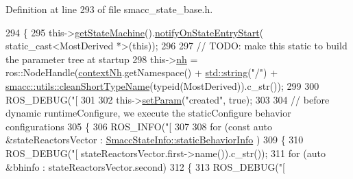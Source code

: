 Definition at line 293 of file smacc\+\_\+state\+\_\+base.\+h.


\begin{DoxyCode}
294   \{
295     this->\hyperlink{classsmacc_1_1SmaccState_afc39f8e0ca4001b2159a100da2fccd0e}{getStateMachine}().\hyperlink{classsmacc_1_1ISmaccStateMachine_aeec54e997d715b105ebfeb5caadc4fbf}{notifyOnStateEntryStart}(
      static\_cast<MostDerived *>(\textcolor{keyword}{this}));
296 
297     \textcolor{comment}{// TODO: make this static to build the parameter tree at startup}
298     this->\hyperlink{classsmacc_1_1ISmaccState_a13fe6e6abfdb87996402189d44b78494}{nh} = ros::NodeHandle(\hyperlink{classsmacc_1_1ISmaccState_ae59191a663a08489b7d10036f3b25238}{contextNh}.getNamespace() + \hyperlink{namespacetesting_1_1internal_a8e8ff5b11e64078831112677156cb111}{std::string}(\textcolor{stringliteral}{"/"}) + 
      \hyperlink{namespacesmacc_1_1utils_aacd1975bb7cd9bec4b50e111a2ae7edb}{smacc::utils::cleanShortTypeName}(\textcolor{keyword}{typeid}(MostDerived)).c\_str());
299 
300     ROS\_DEBUG(\textcolor{stringliteral}{"[%
301 
302     this->\hyperlink{classsmacc_1_1ISmaccState_a0b6c531ca8c446052022308548f55b92}{setParam}(\textcolor{stringliteral}{"created"}, \textcolor{keyword}{true});
303 
304     \textcolor{comment}{// before dynamic runtimeConfigure, we execute the staticConfigure behavior configurations}
305     \{
306       ROS\_INFO(\textcolor{stringliteral}{"[%
307 
308       \textcolor{keywordflow}{for} (\textcolor{keyword}{const} \textcolor{keyword}{auto} &stateReactorsVector : \hyperlink{classsmacc_1_1introspection_1_1SmaccStateInfo_ad3d8b3450060cb0b91f38fb2fe0a7678}{SmaccStateInfo::staticBehaviorInfo}
      )
309       \{
310         ROS\_DEBUG(\textcolor{stringliteral}{"[%
      stateReactorsVector.first->name()).c\_str());
311         \textcolor{keywordflow}{for} (\textcolor{keyword}{auto} &bhinfo : stateReactorsVector.second)
312         \{
313           ROS\_DEBUG(\textcolor{stringliteral}{"[%
}}}}
\end{DoxyCode}
